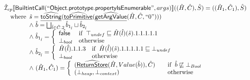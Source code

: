 \[
\begin{array}{l}
\aI _{cp}\lbr \SF{BuiltintCall}(``\SF{Object.prototype.propertyIsEnumerable}",args)\rbr((\hat{H},\hat{C}), \hat{S})
  = ((\hat{H}_1, \hat{C}_1), \hat{S})\\
\quad\wherec{
  \hat{s} = \ahf{toString}(\ahf{toPrimitive}(\ahf{getArgValue}(\hat{H}, \hat{C}, ``0")))\\
  \land\ \hat{b} = \bigsqcup_{\hat{l} \in \hat{C}.2} \hat{b}_{1_{\hat{l}}} \sqcup \hat{b}_{2_{\hat{l}}}\\
  \land\ \hat{b}_{1_{\hat{l}}} = \left\{\begin{array}{ll}
      \afalse & \ifc{\top_{undef} \sqsubseteq \hat{H}(\hat{l})(\hat{s}).1.1.1.1.1}\\
      \bot_{bool} & \owc
    \end{array}\right.\\
  \land\ \hat{b}_{2_{\hat{l}}} = \left\{\begin{array}{ll}
      \hat{H}(\hat{l}).1.1.3 & \ifc{\hat{H}(\hat{l})(\hat{s}).1.1.1.1.1 \sqsubseteq \bot_{undef}}\\
      \bot_{bool} & \owc
    \end{array}\right.\\
  \land\ (\hat{H}_1, \hat{C}_1) = 
    \left\{\begin{array}{l@{\quad\quad}l}
      (\ahf{ReturnStore}(\hat{H}, Value(\hat{b})), \hat{C})
      & \ifc{\hat{b}\not\sqsubseteq \bot_{Bool}}\\
      (\bot_{heap}, \bot_{context}) & \owc \\
    \end{array}\right.\\
  }\\
\\\\ 

\end{array}
\]


